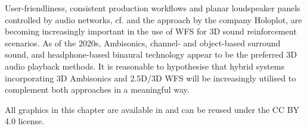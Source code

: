 User-friendliness, consistent production workflows and planar loudspeaker
panels controlled by audio networks, cf. \cite{Reussner2013_JAES}
and the approach by the company Holoplot,
are becoming increasingly important in the use of WFS for 3D sound reinforcement
scenarios.
%
As of the 2020s, Ambisonics, channel- and object-based surround sound,
and headphone-based binaural technology appear to be the preferred 3D audio
playback methods.
%
It is reasonable to hypothesise that hybrid systems incorporating 3D Ambisonics
and 2.5D/3D WFS will be increasingly utilised to complement both approaches in
a meaningful way.



\vspace{\baselineskip}All graphics in this chapter are available
in \cite{SchultzHahnSpors2025} and can be reused under the CC BY 4.0 license.
